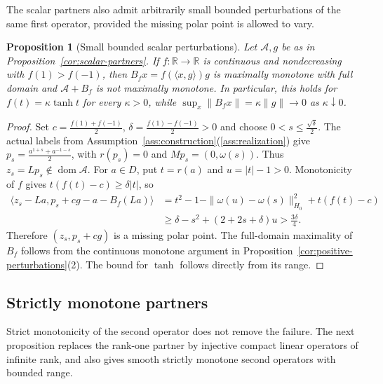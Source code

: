 \documentclass[11pt]{article}
\newcommand{\R}{\mathbb R}
\newcommand{\dom}{\operatorname{dom}}
\newcommand{\pair}[2]{\langle #1,#2\rangle}
\newtheorem{proposition}{Proposition}
\theoremstyle{definition}
\theoremstyle{remark}
\begin{document}
The scalar partners also admit arbitrarily small bounded perturbations of the same first operator, provided the missing polar point is allowed to vary.

\begin{proposition}[Small bounded scalar perturbations]
\label{cor:small-bounded-partners}
Let $\mathcal A,g$ be as in Proposition~\ref{cor:scalar-partners}. If $f:\R\to\R$ is continuous and nondecreasing with $f(1)>f(-1)$, then $B_fx=f(\pair{x}{g})g$ is maximally monotone with full domain and $\mathcal A+B_f$ is not maximally monotone. In particular, this holds for $f(t)=\kappa\tanh t$ for every $\kappa>0$, while $\sup_x\|B_fx\|=\kappa\|g\|\to0$ as $\kappa\downarrow0$.
\end{proposition}
\begin{proof}
Set $c=\frac{f(1)+f(-1)}2$, $\delta=\frac{f(1)-f(-1)}2>0$ and choose $0<s\le\frac{\sqrt\delta}{2}$. The actual labels from Assumption~\ref{ass:construction}\textup{(\ref{ass:realization})} give $p_s=\frac{a^{1+s}+a^{-1-s}}2$, with $r(p_s)=0$ and $Mp_s=(0,\omega(s))$. Thus $z_s=Lp_s\notin\dom\mathcal A$. For $a\in D$, put $t=r(a)$ and $u=|t|-1>0$. Monotonicity of $f$ gives $t(f(t)-c)\ge\delta|t|$, so
\[
\begin{aligned}
\pair{z_s-La}{p_s+cg-a-B_f(La)}
&=t^2-1-\|\omega(u)-\omega(s)\|_{H_0}^2+t(f(t)-c)\\
&\ge\delta-s^2+(2+2s+\delta)u>\frac{3\delta}{4}.
\end{aligned}
\]
Therefore $(z_s,p_s+cg)$ is a missing polar point. The full-domain maximality of $B_f$ follows from the continuous monotone argument in Proposition~\ref{cor:positive-perturbations}(2). The bound for $\tanh$ follows directly from its range.
\end{proof}

\subsection{Strictly monotone partners}
\label{subsec:appendix-strict}

Strict monotonicity of the second operator does not remove the failure. The next proposition replaces the rank-one partner by injective compact linear operators of infinite rank, and also gives smooth strictly monotone second operators with bounded range.
\end{document}
